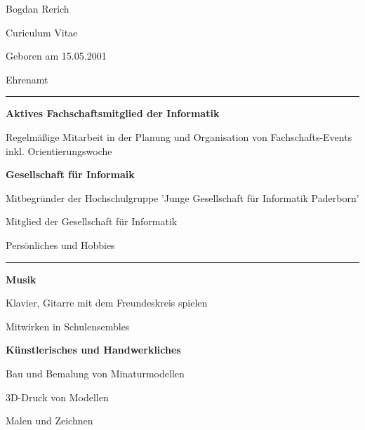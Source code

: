 \documentclass{letter}
\begin{document}
\begin{minipage}[t]{0.60\textwidth}
\setlength{\baselineskip}{1.5\baselineskip}
\vspace{0.8cm}
{\huge Bogdan Rerich}

{\large Curiculum Vitae}

\vspace{0.5cm}
 
Geboren am 15.05.2001

\vspace{0.5cm}

{\large Ehrenamt}
\rule{\linewidth}{0.4pt}

{\large \textbf{Aktives Fachschaftsmitglied der Informatik}}

{\small Regelmäßige Mitarbeit in der Planung und Organisation von Fachschafts-Events inkl. Orientierungswoche}

{\large \textbf{Gesellschaft für Informaik}}

{\small Mitbegründer der Hochschulgruppe 'Junge Gesellschaft für Informatik Paderborn'}

{\small Mitglied der Gesellschaft für Informatik}

{\large Persönliches und Hobbies}
\rule{\linewidth}{0.4pt}

{\large \textbf{Musik}}

{\small Klavier, Gitarre mit dem Freundeskreis spielen}

{\small Mitwirken in Schulensembles}

{\large \textbf{Künstlerisches und Handwerkliches}}

{\small Bau und Bemalung von Minaturmodellen}

{\small 3D-Druck von Modellen}

{\small Malen und Zeichnen}








\end{minipage}
\end{document}
